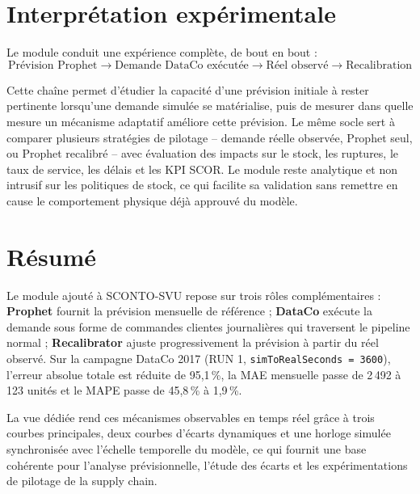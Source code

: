 \documentclass[11pt,a4paper]{article}
\newcommand{\code}[1]{\texttt{#1}}
\begin{document}
\section{Interprétation expérimentale}

Le module conduit une expérience complète, de bout en bout :
\[
\boxed{\text{Prévision Prophet} \longrightarrow \text{Demande DataCo exécutée} \longrightarrow \text{Réel observé} \longrightarrow \text{Recalibration}}
\]

Cette chaîne permet d'étudier la capacité d'une prévision initiale à rester pertinente lorsqu'une demande simulée se matérialise, puis de mesurer dans quelle mesure un mécanisme adaptatif améliore cette prévision. Le même socle sert à comparer plusieurs stratégies de pilotage -- demande réelle observée, Prophet seul, ou Prophet recalibré -- avec évaluation des impacts sur le stock, les ruptures, le taux de service, les délais et les KPI SCOR. Le module reste analytique et non intrusif sur les politiques de stock, ce qui facilite sa validation sans remettre en cause le comportement physique déjà approuvé du modèle.

\section{Résumé}

Le module ajouté à SCONTO-SVU repose sur trois rôles complémentaires : \textbf{Prophet} fournit la prévision mensuelle de référence ; \textbf{DataCo} exécute la demande sous forme de commandes clientes journalières qui traversent le pipeline normal ; \textbf{Recalibrator} ajuste progressivement la prévision à partir du réel observé. Sur la campagne DataCo 2017 (RUN 1, \code{simToRealSeconds = 3600}), l'erreur absolue totale est réduite de 95,1\,\%, la MAE mensuelle passe de 2\,492 à 123 unités et le MAPE passe de 45,8\,\% à 1,9\,\%.

La vue dédiée rend ces mécanismes observables en temps réel grâce à trois courbes principales, deux courbes d'écarts dynamiques et une horloge simulée synchronisée avec l'échelle temporelle du modèle, ce qui fournit une base cohérente pour l'analyse prévisionnelle, l'étude des écarts et les expérimentations de pilotage de la supply chain.
\end{document}
